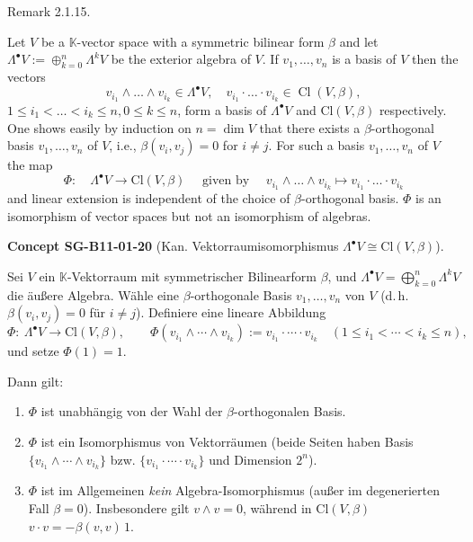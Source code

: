 \documentclass[10pt, letterpaper]{article}
\newcommand{\Cl}{\mathrm{Cl}}
\newcommand{\CustomHeading}[3]{%
  \par\medskip\noindent%
  \textbf{#1 #2} \textnormal{(#3)}.\enskip%
}
\newenvironment{CONC}[2]{\begin{unitbox}\CustomHeading{Concept}{#1}{#2}}{\end{unitbox}}
\begin{document}
Remark 2.1.15. 


Let $V$ be a $\mathbb{K}$-vector space with a symmetric bilinear form $\beta$ and let $\Lambda^{\bullet} V:=\oplus_{k=0}^{n} \Lambda^{k} V$ be the exterior algebra of $V$. If $v_{1}, \ldots, v_{n}$ is a basis of $V$ then the vectors
$$
v_{i_{1}} \wedge \ldots \wedge v_{i_{k}} \in \Lambda^{\bullet} V, \quad v_{i_{1}} \cdot \ldots \cdot v_{i_{k}} \in \operatorname{Cl}(V, \beta),
$$
$1 \leq i_{1}<\ldots<i_{k} \leq n, 0 \leq k \leq n$, form a basis of $\Lambda^{\bullet} V$ and $\mathrm{Cl}(V, \beta)$ respectively. One shows easily by induction on $n=\operatorname{dim} V$ that there exists a $\beta$-orthogonal basis $v_{1}, \ldots, v_{n}$ of $V$, i.e., $\beta\left(v_{i}, v_{j}\right)=0$ for $i \neq j$. For such a basis $v_{1}, \ldots, v_{n}$ of $V$ the map
$$
\Phi: \quad \Lambda^{\bullet} V \rightarrow \mathrm{Cl}(V, \beta) \quad \text { given by } \quad v_{i_{1}} \wedge \ldots \wedge v_{i_{k}} \mapsto v_{i_{1}} \cdot \ldots \cdot v_{i_{k}}
$$
and linear extension is independent of the choice of $\beta$-orthogonal basis. $\Phi$ is an isomorphism of vector spaces but not an isomorphism of algebras.




\begin{CONC}{SG-B11-01-20}{Kan. Vektorraumisomorphismus \(\Lambda^\bullet V \cong \Cl(V,\beta)\)}
Sei \(V\) ein \(\mathbb{K}\)-Vektorraum mit symmetrischer Bilinearform \(\beta\), und
\(\Lambda^\bullet V=\bigoplus_{k=0}^n \Lambda^k V\) die äußere Algebra.
Wähle eine \(\beta\)-orthogonale Basis \(v_1,\dots,v_n\) von \(V\) (d.\,h. \(\beta(v_i,v_j)=0\) für \(i\neq j\)).
Definiere eine lineare Abbildung
\[
\Phi:\ \Lambda^\bullet V \longrightarrow \Cl(V,\beta),\qquad
\Phi\!\left(v_{i_1}\wedge\cdots\wedge v_{i_k}\right):=
v_{i_1}\cdot\cdots\cdot v_{i_k}
\quad(1\le i_1<\cdots<i_k\le n),
\]
und setze \(\Phi(1)=1\).

Dann gilt:
\begin{enumerate}
\item \(\Phi\) ist unabhängig von der Wahl der \(\beta\)-orthogonalen Basis.
\item \(\Phi\) ist ein Isomorphismus von Vektorräumen (beide Seiten haben Basis
\(\{v_{i_1}\wedge\cdots\wedge v_{i_k}\}\) bzw. \(\{v_{i_1}\cdot\cdots\cdot v_{i_k}\}\) und Dimension \(2^n\)).
\item \(\Phi\) ist im Allgemeinen \emph{kein} Algebra-Isomorphismus (außer im degenerierten Fall \(\beta=0\)).
Insbesondere gilt \(v\wedge v=0\), während in \(\Cl(V,\beta)\) \(v\cdot v=-\beta(v,v)\,1\).
\end{enumerate}
\end{CONC}
\end{document}
